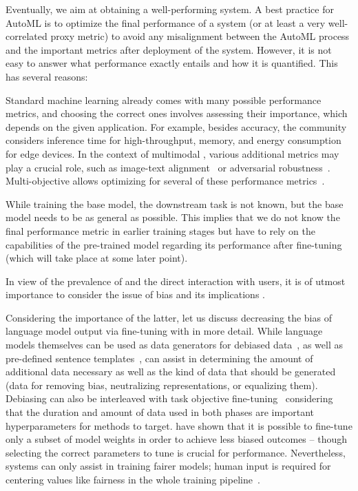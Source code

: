 \documentclass[10pt]{article} %
\begin{document}
Eventually, we aim at obtaining a well-performing \LLM system. A best practice for AutoML is to optimize the final performance of a system (or at least a very well-correlated proxy metric) to avoid any misalignment between the AutoML process and the important metrics after deployment of the system. However, it is not easy to answer what performance exactly entails and how it is quantified. This has several reasons: \begin{inparaenum}[(i)]
    \item Standard machine learning already comes with many possible performance metrics, and choosing the correct ones involves assessing their importance, which depends on the given application. For example, besides accuracy, the community considers inference time for high-throughput, memory, and energy consumption for edge devices. In the context of multimodal \LLMs, various additional metrics may play a crucial role, such as image-text alignment~\citep{xu-cvpr18a, grimal-arxiv2023a} or adversarial robustness~\citep{zhao-neurips23a}. Multi-objective \AutoML allows optimizing for several of these performance metrics~\citep{moraleshernandez-arxiv21a,karl-evolearn23a}.
    \item While training the base model, the downstream task is not known, but the base model needs to be as general as possible. This implies that we do not know the final performance metric in earlier training stages but have to rely on the capabilities of the pre-trained model regarding its performance after fine-tuning (which will take place at some later point). 
    \item In view of the prevalence of \LLMs and the direct interaction with users, it is of utmost importance to consider the issue of bias and its implications \citep{kumar-etal-2023-language}.
\end{inparaenum}

Considering the importance of the latter, let us discuss decreasing the bias of language model output via fine-tuning with \AutoML in more detail. While language models themselves can be used as data generators for debiased data~\citep{schick-tacl21,hernandez-arxiv23}, as well as pre-defined sentence templates~\citep{liang-acl20}, \AutoML can assist in determining the amount of additional data necessary as well as the kind of data that should be generated (data for removing bias, neutralizing representations, or equalizing them). 
Debiasing can also be interleaved with task objective fine-tuning~\citep{saravanan-arxiv23} considering that the duration and amount of data used in both phases are important hyperparameters for \AutoML methods to target.
\citet{gira-ltedi22} have shown that it is possible to fine-tune only a subset of model weights in order to achieve less biased outcomes -- though selecting the correct parameters to tune is crucial for performance.
Nevertheless, \AutoML systems can only assist in training fairer models; human input is required for centering values like fairness in the whole training pipeline~\citep{bender-facct21,weerts-arxiv23a}.
\end{document}
